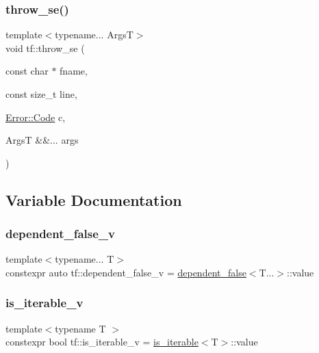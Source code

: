 \mbox{\label{namespacetf_ab9d4e31acc93431725fa1affca09e823}} 
\subsubsection{\texorpdfstring{throw\+\_\+se()}{throw\_se()}}
{\footnotesize\ttfamily template$<$typename... ArgsT$>$ \\
void tf\+::throw\+\_\+se (\begin{DoxyParamCaption}\item[{const char $\ast$}]{fname,  }\item[{const size\+\_\+t}]{line,  }\item[{\hyperlink{structtf_1_1Error_aad6732b815bfe4ae3cea402042ee43a3}{Error\+::\+Code}}]{c,  }\item[{ArgsT \&\&...}]{args }\end{DoxyParamCaption})}



\subsection{Variable Documentation}
\mbox{\label{namespacetf_ac47db20fe8976148fb7523a31a1039ce}} 
\subsubsection{\texorpdfstring{dependent\+\_\+false\+\_\+v}{dependent\_false\_v}}
{\footnotesize\ttfamily template$<$typename... T$>$ \\
constexpr auto tf\+::dependent\+\_\+false\+\_\+v = \hyperlink{structtf_1_1dependent__false}{dependent\+\_\+false}$<$T...$>$\+::value}

\mbox{\label{namespacetf_a19ce57208fa48a058ae54864d4b343f3}} 
\subsubsection{\texorpdfstring{is\+\_\+iterable\+\_\+v}{is\_iterable\_v}}
{\footnotesize\ttfamily template$<$typename T $>$ \\
constexpr bool tf\+::is\+\_\+iterable\+\_\+v = \hyperlink{structtf_1_1is__iterable}{is\+\_\+iterable}$<$T$>$\+::value\hspace{0.3cm}{\ttfamily [inline]}}

